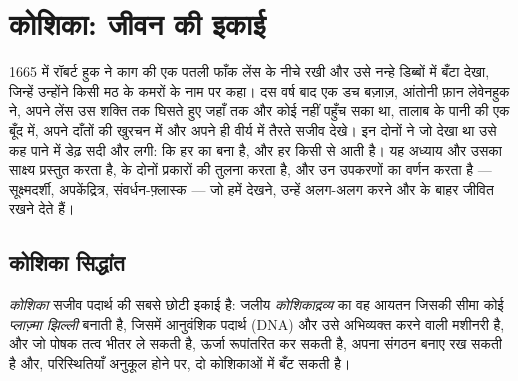 \chapter{कोशिका: जीवन की इकाई}\label{ch:b1:cell-unit-of-life}

1665 में रॉबर्ट हुक ने काग की एक पतली फाँक लेंस के नीचे रखी और उसे नन्हे
डिब्बों में बँटा देखा, जिन्हें उन्होंने किसी मठ के कमरों के नाम पर
 कहा। दस वर्ष बाद एक डच बज़ाज़, आंतोनी फ़ान लेवेनहुक ने, अपने
लेंस उस शक्ति तक घिसते हुए जहाँ तक और कोई नहीं पहुँच सका था, तालाब के
पानी की एक बूँद में, अपने दाँतों की खुरचन में और अपने ही वीर्य में तैरते
सजीव देखे। इन दोनों ने जो देखा था उसे कह पाने में डेढ़ सदी और लगी: कि हर
  का बना है, और हर  किसी  से आती है। यह अध्याय
 और उसका साक्ष्य प्रस्तुत करता है,  के दोनों
प्रकारों की तुलना करता है, और उन उपकरणों का वर्णन करता है --- सूक्ष्मदर्शी,
अपकेंद्रित्र, संवर्धन-फ़्लास्क --- जो हमें  देखने, उन्हें अलग-अलग
करने और  के बाहर जीवित रखने देते हैं।

\section{कोशिका सिद्धांत}

\begin{definition}[कोशिका]\label{def:b1:cell-unit-of-life:cell}
\emph{कोशिका} सजीव पदार्थ की सबसे छोटी इकाई है: जलीय
\emph{कोशिकाद्रव्य} का वह आयतन जिसकी सीमा कोई
\emph{प्लाज़्मा झिल्ली} बनाती है, जिसमें
आनुवंशिक पदार्थ (DNA) और उसे अभिव्यक्त करने वाली मशीनरी है, और जो पोषक
तत्व भीतर ले सकती है, ऊर्जा रूपांतरित कर सकती है, अपना संगठन बनाए रख
सकती है और, परिस्थितियाँ अनुकूल होने पर, दो कोशिकाओं में बँट सकती है।
\end{definition}


